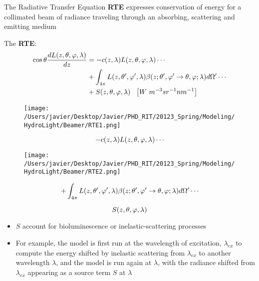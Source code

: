 {The Radiative Transfer Equation}
\textbf{RTE} expresses conservation of energy for a collimated beam of radiance traveling through an absorbing, scattering and emitting medium

\vspace{\baselineskip}

The \textbf{RTE}:
\begin{align}
	\cos\theta\frac{dL(z,\theta,\varphi,\lambda)}{dz}&=-c(z,\lambda)L(z,\theta,\varphi,\lambda)\cdots \notag \\
	&+\int_{4\pi} L(z,\theta',\varphi',\lambda)\beta(z;\theta',\varphi' \to \theta,\varphi;\lambda)d\Omega'\cdots \notag  \\
	&+S(z,\theta,\varphi,\lambda)~~\left[W~m^{-3}sr^{-1}nm^{-1} \right]
\end{align}

\begin{figure}[H]
\centering
  		\texttt{[image: /Users/javier/Desktop/Javier/PHD\_RIT/20123\_Spring/Modeling/HydroLight/Beamer/RTE1.png]}
\end{figure}

\begin{equation}
	-c(z,\lambda)L(z,\theta,\varphi,\lambda)\cdots \notag 
\end{equation}

\begin{figure}[H]
\centering
  		\texttt{[image: /Users/javier/Desktop/Javier/PHD\_RIT/20123\_Spring/Modeling/HydroLight/Beamer/RTE2.png]}
\end{figure}

\begin{equation}
+\int_{4\pi} L(z,\theta',\varphi',\lambda)\beta(z;\theta',\varphi' \to \theta,\varphi;\lambda)d\Omega'\cdots \notag
\end{equation}

{\centering
\begin{equation}
	S(z,\theta,\varphi,\lambda) \notag
\end{equation}}

\begin{itemize}

\item {$S$ account for bioluminescence or inelastic-scattering processes}

\vspace{\baselineskip}

\item For example, the model is first run at the wavelength of excitation, $\lambda_{ex}$ to compute the energy shifted by inelastic scattering from $\lambda_{ex}$ to another wavelength $\lambda$, and the model is run again at $\lambda$, with the radiance shifted from $\lambda_{ex}$ appearing as a source term $S$ at $\lambda$

\end{itemize}


